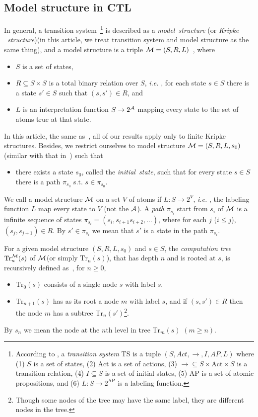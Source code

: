 \documentclass[runningheads]{llncs}
\newcommand\ie{{\it i.e. }}
\newcommand{\rto}{\rightarrow}
\newcommand{\Hm} {{\cal M}}
\newcommand{\Ha} {{\cal A}}
\newcommand{\CTL}{\textrm{CTL}}
\newcommand{\Tr}{\textrm{Tr}}
\begin{document}
\subsection{Model structure in \CTL}
 In general, a transition system~\footnote{According to \cite{Baier:PMC:2008},
a {\em transition system} TS is a tuple $(S, Act,\rto,I, AP, L)$ where
(1) $S$ is a set of states,
(2) $\textrm{Act}$ is a set of actions,
(3) $\rto\subseteq S\times \textrm{Act}\times S$ is a transition relation,
(4) $I\subseteq S$ is a set of initial states,
(5) $\textrm{AP}$ is a set of atomic propositions, and
(6) $L:S\rto 2^{\textrm{AP}}$ is a labeling function.} is described as a \emph{model\ structure} (or \emph{Kripke \ structure})(in this article, we treat transition system and model structure as the same thing), and a model structure is a triple $\Hm=(S,R,L)$~\cite{emerson1990temporal}, where
\begin{itemize}
  \item $S$ is a set of states,
  \item $R\subseteq S\times S$ is a total binary relation over $S$, \ie, for each state $s\in S$ there is a state $s'\in S$ such that $(s,s')\in R$, and
  \item $L$ is an interpretation function $S\rto 2^{\cal A}$ mapping every state to the set of atoms true at that state.
\end{itemize}
In this article, the same as~\cite{DBLP:journals/tcs/BrowneCG88}, all of our results apply only to finite Kripke structures.
Besides, we restrict ourselves to model structure $\Hm=(S,R,L,s_0)$ (similar with that in~\cite{zhang2009refined}) such that
\begin{itemize}
  \item there exists a state $s_0$, called the \emph{initial\ state}, such that for every state $s\in S$ there is a path $\pi_{s_0}$ s.t. $s\in \pi_{s_0}$.
\end{itemize}
We call a model structure $\Hm$ on a set $V$ of atoms if $L: S \rto 2^V$, \ie, the labeling function $L$ map every state to $V$ (not the $\Ha$).  A \emph{path} $\pi_{s_i}$ start from $s_i$ of $\Hm$ is a infinite sequence of states $\pi_{s_i}=(s_i, s_{i+1} s_{i+2},\dots)$, where for each $j$ ($i\leq j$), $(s_j, s_{j+1}) \in R$. By $s'\in \pi_{s_i}$ we mean that $s'$ is a state in the path $\pi_{s_i}$.

For a given model structure $(S,R,L,s_0)$ and $s\in S$,
the {\em computation tree}
$\Tr_n^{\cal M}(s)$ of $\cal M$(or simply $\Tr_n(s)$), that has depth $n$ and is rooted at $s$, is recursively defined as~\cite{DBLP:journals/tcs/BrowneCG88}, for $n\ge 0$,
\begin{itemize}
  \item $\Tr_0(s)$ consists of a single node $s$ with label $s$.
  \item $\Tr_{n+1}(s)$ has as its root a node $m$ with label  $s$, and
  if $(s,s')\in R$ then the node $m$ has a subtree $\Tr_n(s')$\footnote{Though
  some nodes of the tree may have the same label, they are different nodes in the tree.}.
\end{itemize}
By $s_n$ we mean the node at the $n$th level in tree $\Tr_m(s)$ $(m \geq n)$.
\end{document}
